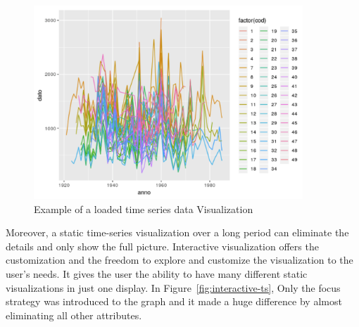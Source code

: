 \begin{figure}[H]
\centering
\captionsetup{justification=centering}
\includegraphics[width=0.9\textwidth]{Report-latex/tex_files/pics/loadedl.png}
\caption{Example of a loaded time series data Visualization \cite{loadedtimeseries}}
\label{fig:loaded-lines}
\end{figure}

Moreover, a static time-series visualization over a long period can eliminate the details and only show the full picture.
Interactive visualization offers the customization and the freedom to explore and customize the visualization to the user's needs. It gives the user the ability to have many different static visualizations in just one display. In Figure~\ref{fig:interactive-ts}, Only the focus strategy was introduced to the graph and it made a huge difference by almost eliminating all other attributes. 

